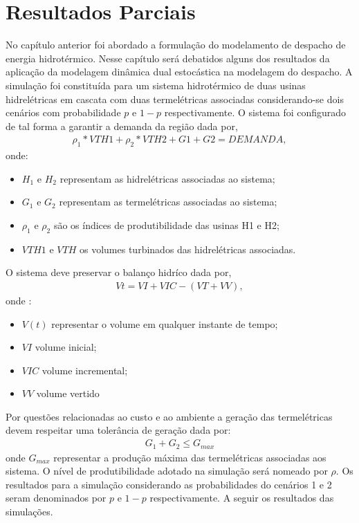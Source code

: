 \graphicspath{ {/home/jefferson/Modelagem/} }
\chapter{Resultados Parciais}
No cap\'itulo anterior foi abordado a formula\c c\~ao do modelamento de despacho de energia hidrot\'ermico. Nesse
cap\'itulo ser\'a debatidos alguns dos resultados da aplica\c c\~ao da modelagem din\^amica dual estoc\'astica na
modelagem do despacho.
A simula\c c\~ao  foi constitu\'ida para um sistema hidrot\'ermico de duas usinas hidrel\'etricas em cascata
com duas termel\'etricas associadas considerando-se dois cen\'arios com probabilidade $p$ e $1-p$ respectivamente.
O sistema foi configurado de tal forma a garantir a demanda da regi\~ao dada por,
\begin{align*}
  \displaystyle{\rho}_1*VTH1 + {\rho}_2*VTH2 + G1 + G2 = DEMANDA,
\end{align*}
onde:
\begin{itemize}
	\item $H_1$ e $H_2$ representam as hidrel\'etricas associadas ao sistema;
	\item $G_1$ e $G_2$ representam as termel\'etricas associadas ao sistema;
	\item $\rho_1$ e $\rho_2$ s\~ao os \'indices de produtibilidade das usinas H1 e H2;
	\item $VTH1$ e $VTH$  os volumes turbinados das hidrel\'etricas associadas.
\end{itemize}
O sistema deve preservar o balan\c co hidr\'ico dada por,
\begin{align*}
  \displaystyle Vt = VI + VIC - \left( VT + VV \right), 
\end{align*}
onde : 
\begin{itemize}
	\item $V(t)$ representar o volume em qualquer instante de tempo;
	\item $VI$  volume inicial;
	\item $VIC$ volume incremental;
	\item $VV$ volume vertido
\end{itemize}
Por quest\~oes relacionadas ao custo e ao ambiente a gera\c c\~ao das termel\'etricas devem respeitar uma toler\^ancia de
gera\c c\~ao dada por:
\begin{align*}
	G_1 + G_2 \leq G_{max}
\end{align*}
onde $G_{max}$ representar a produ\c c\~ao m\'axima das termel\'etricas associadas aos sistema. O n\'ivel de
produtibilidade adotado na simula\c c\~ao ser\'a nomeado por $\rho$. 
Os resultados para a
simula\c c\~ao considerando as probabilidades do cen\'arios 1 e 2 seram denominados  por $p$ e $ 1 -
p$ respectivamente. A seguir os resultados das simula\c c\~oes.

